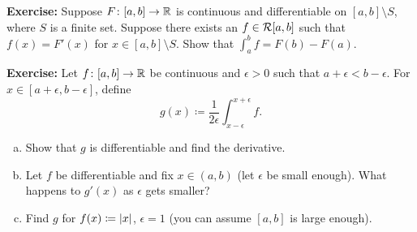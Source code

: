 \documentclass[10pt,aspectratio=169]{beamer}
\begin{document}
\begin{frame}

\textbf{Exercise:}
Suppose $F \colon [a,b] \to {\mathbb{R}}$ is continuous and differentiable
on $[a,b] \setminus S$, where $S$ is a finite set.
\pause
Suppose there
exists an $f \in {\mathcal{R}}[a,b]$ such that $f(x) = F'(x)$ for $x \in [a,b]
\setminus S$.
\pause
Show that
$\int_a^b f = F(b)-F(a)$.

\pause
\medskip

\textbf{Exercise:}
Let $f \colon [a,b] \to {\mathbb{R}}$ be continuous and $\epsilon > 0$ such that
$a+\epsilon < b-\epsilon$.
For $x \in [a+\epsilon,b-\epsilon]$, define
\begin{equation*}
g(x) \coloneqq \frac{1}{2\epsilon} \int_{x-\epsilon}^{x+\epsilon} f .
\end{equation*}
\begin{enumerate}[a)]
\item\pause
Show that $g$ is differentiable and find the derivative.
\item\pause
Let $f$ be differentiable and fix $x \in (a,b)$ (let $\epsilon$
be small enough).  What happens to $g'(x)$ as $\epsilon$ gets smaller?
\item\pause
Find $g$ for $f(x) \coloneqq \left\lvert {x} \right\rvert$, $\epsilon = 1$ (you can assume 
$[a,b]$ is large enough).
\end{enumerate}

\end{frame}
\end{document}

